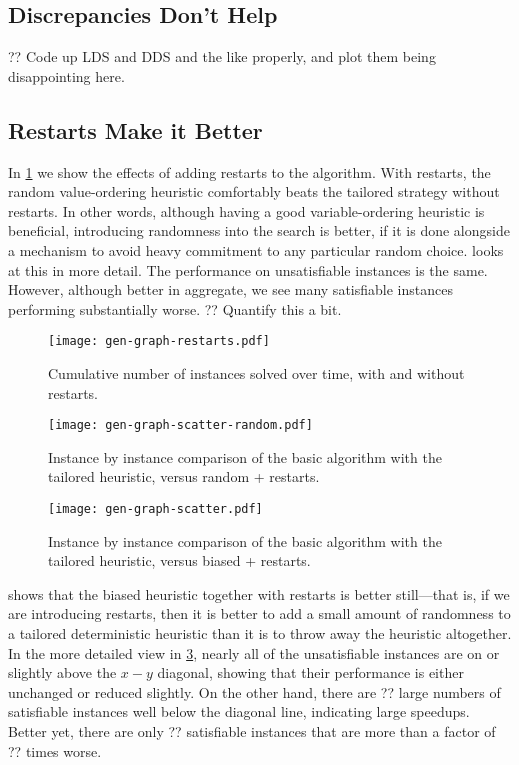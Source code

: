 \documentclass{article}
\begin{document}
\subsection{Discrepancies Don't Help}

?? Code up LDS and DDS and the like properly, and plot them being disappointing here.

\subsection{Restarts Make it Better}

In \cref{figure:restarts} we show the effects of adding restarts to the algorithm. With restarts,
the random value-ordering heuristic comfortably beats the tailored strategy without restarts. In
other words, although having a good variable-ordering heuristic is beneficial, introducing
randomness into the search is better, if it is done alongside a mechanism to avoid heavy commitment
to any particular random choice.  looks at this in more detail.  The
performance on unsatisfiable instances is the same. However, although better in aggregate, we see
many satisfiable instances performing substantially worse. ?? Quantify this a bit.

\begin{figure}[p]
    \centering
    \texttt{[image: gen-graph-restarts.pdf]}

    \caption{Cumulative number of instances solved over time, with and without restarts.}
    \label{figure:restarts}
\end{figure}

\begin{figure}[p]
    \centering
    \texttt{[image: gen-graph-scatter-random.pdf]}
    \caption{Instance by instance comparison of the basic algorithm with the tailored heuristic,
    versus random + restarts.}
    \label{figure:scatter-random}
\end{figure}

\begin{figure}[p]
    \centering
    \texttt{[image: gen-graph-scatter.pdf]}

    \caption{Instance by instance comparison of the basic algorithm with the tailored heuristic,
    versus biased + restarts.}
    \label{figure:scatter}
\end{figure}

 shows that the biased heuristic together with restarts is better
still---that is, if we are introducing restarts, then it is better to add a small amount of
randomness to a tailored deterministic heuristic than it is to throw away the heuristic altogether.
In the more detailed view in \cref{figure:scatter},
nearly all of the unsatisfiable instances are on or slightly above the $x-y$ diagonal, showing that
their performance is either unchanged or reduced slightly. On the other hand, there are ?? large
numbers of satisfiable instances well below the diagonal line, indicating large speedups. Better
yet, there are only ?? satisfiable instances that are more than a factor of ?? times worse.
\end{document}
